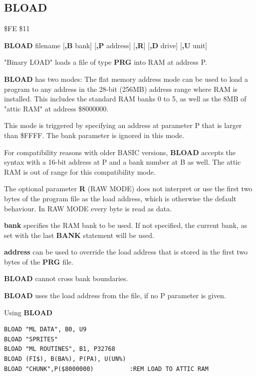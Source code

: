 \subsection{BLOAD}
\begin{description}[leftmargin=2cm,style=nextline]
\item [Token:] \$FE \$11
\item [Format:] {\bf BLOAD} filename [{\bf,B} bank] [{\bf,P} address] [{\bf,R}]
		[{\bf,D} drive] [{\bf,U} unit]
\item [Usage:]
   "Binary LOAD" loads a file of type {\bf PRG} into RAM at address P.

   {\bf BLOAD} has two modes:
   The flat memory address mode can be used to load a program to any
   address in the 28-bit (256MB) address range where RAM is installed.
   This includes the standard RAM banks 0 to 5, as well as
   the 8MB of "attic RAM" at address \$8000000.

   This mode is triggered by specifying an address at parameter P
   that is larger than \$FFFF. The bank parameter is ignored in this mode.

   For compatibility reasons with older BASIC versions, {\bf BLOAD}
   accepts the syntax with a 16-bit address at P and a bank number at B as well.
   The attic RAM is out of range for this compatibility mode.

   The optional parameter {\bf R} (RAW MODE) does not interpret or use the
   first two bytes of the program file as the load address, which is otherwise the
   default behaviour. In RAW MODE every byte is read as data.

   \filenamedefinition

   {\bf bank} specifies the RAM bank to be used.
   If not specified, the current bank, as set with the last
   {\bf BANK} statement will be used.

   {\bf address} can be used to override the load address
   that is stored in the first two bytes of the {\bf PRG} file.

   \drivedefinition

   \unitdefinition

\item [Remarks:]
   {\bf BLOAD} cannot cross bank boundaries.

{\bf BLOAD} uses the load address from the file, if no P parameter is given.

\item [Examples:] Using {\bf BLOAD}
\begin{tcolorbox}[colback=black,coltext=white]
\verbatimfont{\codefont}
\begin{verbatim}
BLOAD "ML DATA", B0, U9
BLOAD "SPRITES"
BLOAD "ML ROUTINES", B1, P32768
BLOAD (FI$), B(BA%), P(PA), U(UN%)
BLOAD "CHUNK",P($8000000)          :REM LOAD TO ATTIC RAM
\end{verbatim}
\end{tcolorbox}
\end{description}

